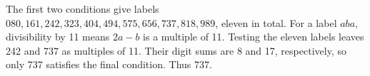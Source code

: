 The first two conditions give labels $080,161,242,323,404,494,575,656,737,818,989$, eleven in total. For a label $aba$, divisibility by 11 means $2a-b$ is a multiple of 11. Testing the eleven labels leaves 242 and 737 as multiples of 11. Their digit sums are 8 and 17, respectively, so only 737 satisfies the final condition. Thus $\boxed{737}$.

